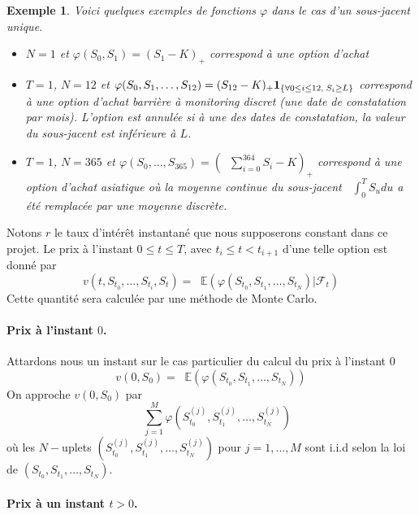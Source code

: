\documentclass[a4paper,11pt]{article}
\def\cf{{\mathcal F}}
\def\E{{\mathbb E}}
\def\ind#1{{\bf 1}_{#1}}
\def\inv#1{\mathop{\frac{1}{ #1}}\nolimits}
\def\expp#1{\mathop {\mathrm{e}^{ #1}}}
\newtheorem*{ex}{Exemple}
\begin{document}
\begin{ex} Voici quelques exemples de fonctions $\varphi$ dans le cas d'un
  sous-jacent unique.
  \begin{itemize}
    \item $N=1$ et $\varphi(S_0, S_1) = (S_1 - K)_+$ correspond à une option d'achat
    \item $T = 1$, $N=12$  et $\varphi(S_0, S_1, \dots, S_{12}) = (S_{12} - K)_+ \ind{\{\forall 0 \le i \le 12,\; S_i \ge L\}}$ correspond à une option d'achat barrière à monitoring discret (une date de constatation par mois).  L'option est annulée si à une des dates de constatation, la valeur du sous-jacent est inférieure à $L$.
    \item $T=1$, $N=365$ et $\varphi(S_0, \dots, S_{365}) = (\inv{365} \sum_{i=0}^{364} S_i - K)_+$ correspond à une option d'achat asiatique où la moyenne continue du sous-jacent $\inv{T} \int_0^T S_u du$ a été remplacée par une moyenne discrète.
  \end{itemize}
\end{ex}
Notons $r$ le taux d'intérêt instantané que nous supposerons constant dans ce projet. Le prix à l'instant $0 \le t \le T$, avec $t_i \le t < t_{i+1}$ d'une telle option est donné par
\begin{equation*}
  v(t, S_{t_0}, \dots, S_{t_i}, S_t) = \expp{-r (T - t)} \E(\varphi(S_{t_0},
  S_{t_1}, \dots, S_{t_N}) | \cf_{t})
\end{equation*}
Cette quantité sera calculée par une méthode de Monte Carlo.

\paragraph{Prix à l'instant $0$.}

Attardons nous un instant sur le cas particulier du calcul du prix à l'instant $0$
\begin{equation*}
  v(0, S_{0}) = \expp{-r T} \E(\varphi(S_{t_0}, S_{t_1}, \dots, S_{t_N}))
\end{equation*}
On approche $v(0,S_0)$ par
\begin{equation*}
  \expp{-r T} \inv{M} \sum_{j=1}^M \varphi(S_{t_0}^{(j)}, S_{t_1}^{(j)}, \dots, S_{t_N}^{(j)})
\end{equation*}
où les $N-$uplets $(S_{t_0}^{(j)}, S_{t_1}^{(j)}, \dots, S_{t_N}^{(j)})$ pour $j=1,\dots,M$ sont i.i.d selon la loi de $(S_{t_0}, S_{t_1}, \dots, S_{t_N})$. \\

\paragraph{Prix à un instant $t>0$.}
\end{document}
